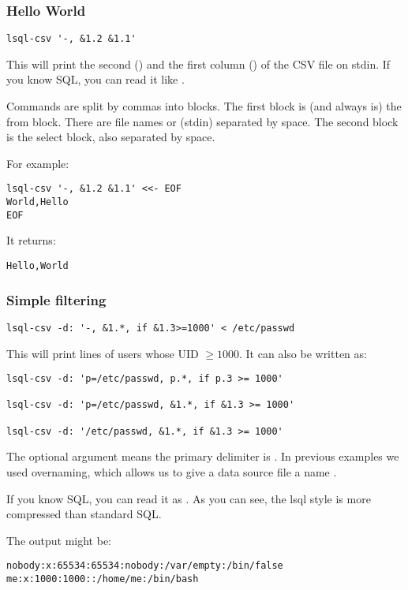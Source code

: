 \subsubsection{Hello World}
\begin{verbatim}
lsql-csv '-, &1.2 &1.1'
\end{verbatim}
This will print the second () and the first column () of the CSV file on stdin. If you know SQL, you can read it like .

Commands are split by commas into blocks. The first block is (and always is) the from block. There are file names or \icode{-} (stdin) separated by space. The second block is the select block, also separated by space.

For example:
\begin{verbatim}
lsql-csv '-, &1.2 &1.1' <<- EOF
World,Hello
EOF
\end{verbatim}
It returns:
\begin{verbatim}
Hello,World
\end{verbatim}


\subsubsection{Simple filtering}

\begin{verbatim}
lsql-csv -d: '-, &1.*, if &1.3>=1000' < /etc/passwd
\end{verbatim}
This will print lines of users whose UID $\geq 1000$. It can also be written as:
\begin{verbatim}
lsql-csv -d: 'p=/etc/passwd, p.*, if p.3 >= 1000'
    
lsql-csv -d: 'p=/etc/passwd, &1.*, if &1.3 >= 1000'

lsql-csv -d: '/etc/passwd, &1.*, if &1.3 >= 1000'
\end{verbatim}
The  optional argument means the primary delimiter is \icode{:}. In previous examples we used overnaming, which allows us to give a data source file  a name .

If you know SQL, you can read it as . As you can see, the lsql style is more compressed than standard SQL.

The output might be:
\begin{verbatim}
nobody:x:65534:65534:nobody:/var/empty:/bin/false
me:x:1000:1000::/home/me:/bin/bash
\end{verbatim}

